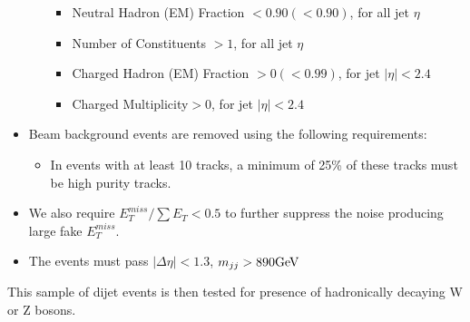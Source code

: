 \begin{itemize}
\begin{itemize}
                 \begin{itemize}
                     \item   Neutral Hadron (EM) Fraction $< 0.90 (< 0.90)$, for all jet $\eta$
                     \item   Number of Constituents $> 1$, for all jet $\eta$
                     \item   Charged Hadron (EM) Fraction $> 0 (< 0.99)$, for jet $|\eta| < 2.4$
                     \item   Charged Multiplicity$ > 0$, for jet $|\eta| < 2.4$
                 \end{itemize}
        \end{itemize}
\item Beam background events are removed using the following requirements:
        \begin{itemize}
        \item In events with at least 10 tracks, a minimum of 25\% of
          these tracks must be high purity tracks.
        \end{itemize}
\item  We also require $E_{T}^{miss}/\sum{E_{T}} < 0.5$ to further suppress the noise producing large fake $E_{T}^{miss}$. 
\item The events must pass $|\Delta\eta|<1.3$, $m_{jj} > 890  \mathrm{GeV}$
\end{itemize}

This sample of dijet events is then tested for presence of
hadronically decaying W or Z bosons.
